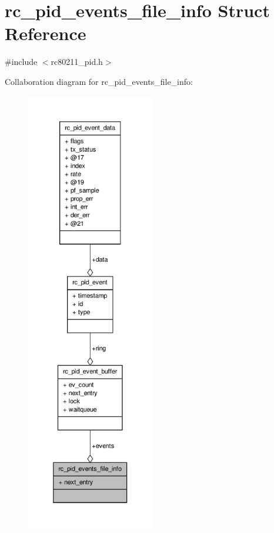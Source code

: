 \hypertarget{structrc__pid__events__file__info}{\section{rc\-\_\-pid\-\_\-events\-\_\-file\-\_\-info Struct Reference}
\label{structrc__pid__events__file__info}
}


{\ttfamily \#include $<$rc80211\-\_\-pid.\-h$>$}



Collaboration diagram for rc\-\_\-pid\-\_\-events\-\_\-file\-\_\-info\-:
\nopagebreak
\begin{figure}[H]
\begin{center}
\leavevmode
\includegraphics[height=550pt]{structrc__pid__events__file__info__coll__graph}
\end{center}
\end{figure}
